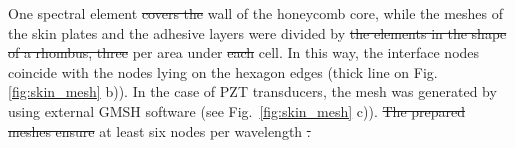 \documentclass[materials,article,submit,moreauthors,pdftex]{Definitions/mdpi}
\providecommand{\DIFadd}[1]{{\protect\color{blue}{#1}}} %
\providecommand{\DIFdel}[1]{{\protect\color{red}\sout{#1}}}                      %
\providecommand{\DIFaddbegin}{} %
\providecommand{\DIFaddend}{} %
\providecommand{\DIFdelbegin}{} %
\providecommand{\DIFdelend}{} %
\begin{document}
\DIFaddend One spectral element \DIFdelbegin \DIFdel{covers the }\DIFdelend \DIFaddbegin \DIFadd{was intended for each }\DIFaddend wall of the honeycomb core, while the meshes of the skin plates and the adhesive layers were divided by \DIFdelbegin \DIFdel{the elements in the shape of a rhombus, three }\DIFdelend \DIFaddbegin \DIFadd{three rhombus elements }\DIFaddend per area under \DIFdelbegin \DIFdel{each }\DIFdelend \DIFaddbegin \DIFadd{the core }\DIFaddend cell.
In this way, the interface nodes coincide with the nodes lying on the hexagon edges (thick line on Fig. \ref{fig:skin_mesh} b)).
In the case of PZT transducers, the mesh was generated by using external GMSH software \cite{geuzaine2009gmsh} (see Fig.~\ref{fig:skin_mesh} c)).
\DIFdelbegin \DIFdel{The prepared meshes ensure }\DIFdelend \DIFaddbegin \DIFadd{To achieve }\DIFaddend at least six nodes per wavelength \DIFdelbegin \DIFdel{.
}\DIFdelend \DIFaddbegin \DIFadd{within the assumed excitation range, 2D and 3D elements consist of \(4 \times 4\) and \(4 \times 4 \times 4\) nodes, respectively. 
}
\end{document}
